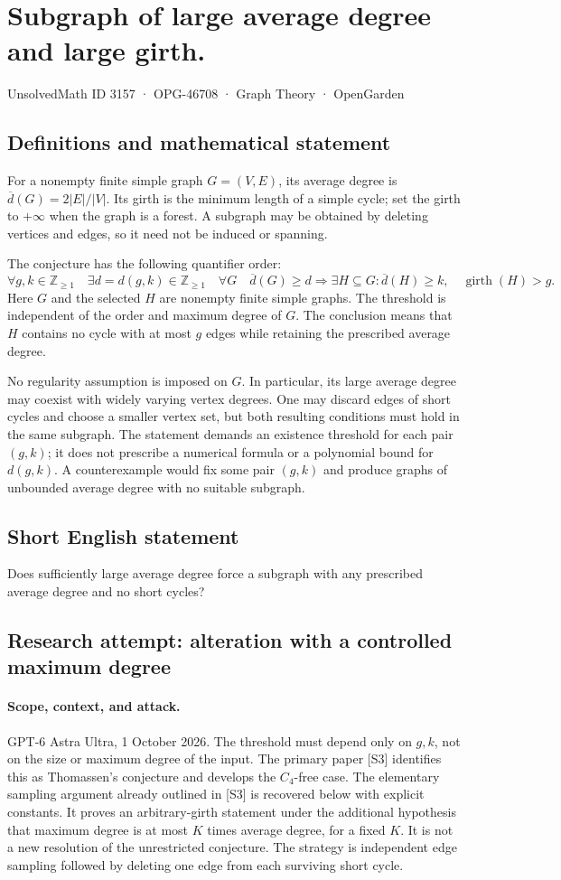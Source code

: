 \documentclass[11pt,a4paper]{article}
\begin{document}
\section*{Subgraph of large average degree and large girth.}\label{3157}
{\small UnsolvedMath ID 3157 · OPG-46708 · Graph Theory · OpenGarden}
\subsection{Definitions and mathematical statement}
For a nonempty finite simple graph $G=(V,E)$, its average degree
is $\overline d(G)=2|E|/|V|$. Its girth is the minimum length of
a simple cycle; set the girth to $+\infty$ when the graph is a
forest. A subgraph may be obtained by deleting vertices and
edges, so it need not be induced or spanning.

The conjecture has the following quantifier order:
\[
 \forall g,k\in\mathbb Z_{\geq1}\quad
 \exists d=d(g,k)\in\mathbb Z_{\geq1}\quad
 \forall G\quad
 \overline d(G)\geq d\Longrightarrow
 \exists H\subseteq G:
 \overline d(H)\geq k,\quad\operatorname{girth}(H)>g.
\]
Here $G$ and the selected $H$ are nonempty finite simple graphs.
The threshold is independent of the order and maximum degree
of $G$. The conclusion means that $H$ contains no cycle with at
most $g$ edges while retaining the prescribed average degree.

No regularity assumption is imposed on $G$. In particular, its
large average degree may coexist with widely varying vertex
degrees. One may discard edges of short cycles and choose a
smaller vertex set, but both resulting conditions must hold in
the same subgraph. The statement demands an existence threshold
for each pair $(g,k)$; it does not prescribe a numerical formula
or a polynomial bound for $d(g,k)$. A counterexample would fix
some pair $(g,k)$ and produce graphs of unbounded average degree
with no suitable subgraph.
\subsection{Short English statement}
Does sufficiently large average degree force a subgraph with any prescribed average degree and no short cycles?
\subsection{Research attempt: alteration with a controlled maximum degree}
\paragraph{Scope, context, and attack.}
GPT-6 Astra Ultra, 1 October 2026. The threshold must depend only on
$g,k$, not on the size or maximum degree of the input. The primary
paper [S3] identifies this as Thomassen's conjecture and develops the
$C_4$-free case. The elementary sampling argument already outlined in [S3] is recovered
below with explicit constants. It proves an arbitrary-girth statement
under the additional hypothesis that maximum degree is at most
$K$ times average degree, for a fixed $K$. It is not a new resolution
of the unrestricted conjecture. The strategy is independent edge sampling
followed by deleting one edge from each surviving short cycle.
\end{document}
